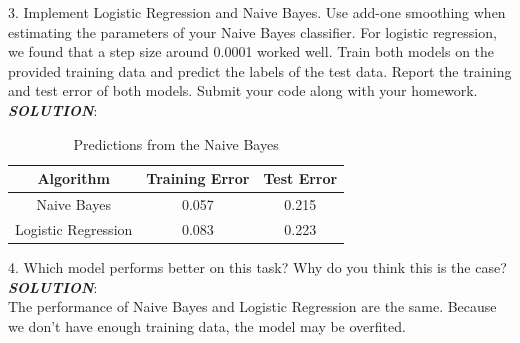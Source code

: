 \documentclass{article}
\theoremstyle{definition}
\theoremstyle{definition}
\theoremstyle{remark}
\begin{document}
3. Implement Logistic Regression and Naive Bayes. Use add-one smoothing when estimating
the parameters of your Naive Bayes classifier. For logistic regression, we found that a step size around
0.0001 worked well. Train both models on the provided training data and predict the labels of the test
data. Report the training and test error of both models. Submit your code along with your homework.\\
\emph{\textbf{SOLUTION}}:\\
\begin{table}[!htbp]
\centering
\begin{tabular}{|c|c|c|}
\hline
 Algorithm& Training Error & Test Error\\
\hline
Naive Bayes & 0.057 & 0.215 \\
\hline
Logistic Regression & 0.083 & 0.223 \\
\hline
\end{tabular}
\caption{Predictions from the Naive Bayes}
\end{table}
4. Which model performs better on this task? Why do you think this is the case?\\
\emph{\textbf{SOLUTION}}:\\
The performance of Naive Bayes and Logistic Regression are the same. Because we don't have enough training data,
the model may be overfited.



\end{document}
